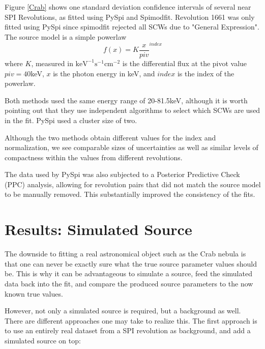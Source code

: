 \documentclass{article}
\begin{document}
Figure \ref{Crab} shows one standard deviation confidence intervals of several near SPI Revolutions, as fitted using PySpi and Spimodfit. Revolution 1661 was only fitted using PySpi since spimodfit rejected all SCWs due to "General Expression". The source model is a simple powerlaw 
\begin{equation} \label{powerlaw}
    f(x) = K \frac{x}{piv}^{index}
\end{equation}
where $K$, measured in $\text{keV}^{-1}\text{s}^{-1}\text{cm}^{-2}$ is the differential flux at the pivot value $piv=40$keV, $x$ is the photon energy in keV, and $index$ is the index of the powerlaw.

Both methods used the same energy range of 20-81.5keV, although it is worth pointing out that they use independent algorithms to select which SCWs are used in the fit. PySpi used a cluster size of two. 

Although the two methods obtain different values for the index and normalization, we see comparable sizes of uncertainties as well as similar levels of compactness within the values from different revolutions. 

The data used by PySpi was also subjected to a Posterior Predictive Check (PPC) analysis, allowing for revolution pairs that did not match the source model to be manually removed. This substantially improved the consistency of the fits.

\section{Results: Simulated Source} \label{Sec: Sim Source}
The downside to fitting a real astronomical object such as the Crab nebula is that one can never be exactly sure what the true source parameter values should be. This is why it can be advantageous to simulate a source, feed the simulated data back into the fit, and compare the produced source parameters to the now known true values.

However, not only a simulated source is required, but a background as well. There are different approaches one may take to realize this. The first approach is to use an entirely real dataset from a SPI revolution as background, and add a simulated source on top:
\end{document}
